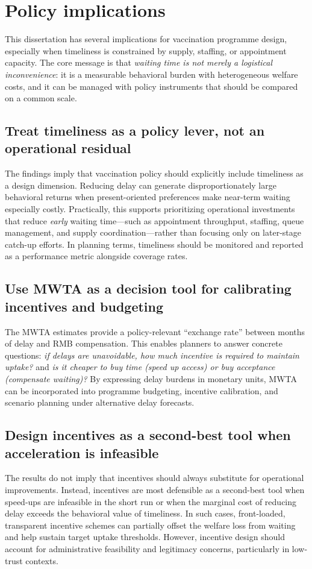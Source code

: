 \documentclass[doublespacing]{utdthesis}
\begin{document}
\section{Policy implications}
\label{sec:dissertation_policy_implications}

This dissertation has several implications for vaccination programme design, especially when timeliness is constrained by supply, staffing, or appointment capacity. The core message is that \emph{waiting time is not merely a logistical inconvenience}: it is a measurable behavioral burden with heterogeneous welfare costs, and it can be managed with policy instruments that should be compared on a common scale.

\subsection{Treat timeliness as a policy lever, not an operational residual}
The findings imply that vaccination policy should explicitly include timeliness as a design dimension. Reducing delay can generate disproportionately large behavioral returns when present-oriented preferences make near-term waiting especially costly. Practically, this supports prioritizing operational investments that reduce \emph{early} waiting time—such as appointment throughput, staffing, queue management, and supply coordination—rather than focusing only on later-stage catch-up efforts. In planning terms, timeliness should be monitored and reported as a performance metric alongside coverage rates.

\subsection{Use MWTA as a decision tool for calibrating incentives and budgeting}
The MWTA estimates provide a policy-relevant ``exchange rate'' between months of delay and RMB compensation. This enables planners to answer concrete questions: \emph{if delays are unavoidable, how much incentive is required to maintain uptake?} and \emph{is it cheaper to buy time (speed up access) or buy acceptance (compensate waiting)?} By expressing delay burdens in monetary units, MWTA can be incorporated into programme budgeting, incentive calibration, and scenario planning under alternative delay forecasts.

\subsection{Design incentives as a second-best tool when acceleration is infeasible}
The results do not imply that incentives should always substitute for operational improvements. Instead, incentives are most defensible as a second-best tool when speed-ups are infeasible in the short run or when the marginal cost of reducing delay exceeds the behavioral value of timeliness. In such cases, front-loaded, transparent incentive schemes can partially offset the welfare loss from waiting and help sustain target uptake thresholds. However, incentive design should account for administrative feasibility and legitimacy concerns, particularly in low-trust contexts.
\end{document}
